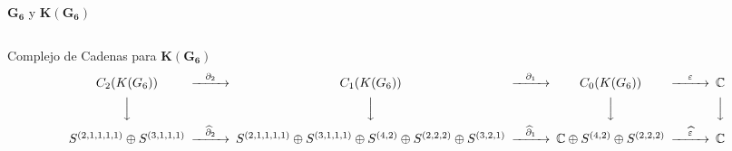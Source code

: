 \documentclass[final,xcolor=svgnames]{beamer}
\begin{document}
\begin{frame}{}
\begin{columns}
\begin{column}{0.5\textwidth}
\begin{block}{$\boldsymbol{G_6}$ y $\boldsymbol{K(G_6)}$}
      \begin{minipage}{0.15\linewidth}    
        \begin{center}
        \end{center}
      \end{minipage}
      \begin{minipage}{0.15\linewidth}    
        \begin{center}
        \end{center}
      \end{minipage}
  \end{block}

    \end{column}
  \end{columns}

  \vfill

  \begin{block}{Complejo de Cadenas para $\boldsymbol{K(G_{6})}$}
    \[
    \begin{CD}
      C_{2}(K(G_{6})) @>{\partial_{2}}>> C_{1}(K(G_{6})) @>{\partial_{1}}>> C_{0}(K(G_{6})) @>{\varepsilon}>> \mathbb{C}\\
      @VVV   @VVV   @VVV   @VVV    \\
      S^{(2,1,1,1,1)}\oplus S^{(3,1,1,1)} @>{\widehat\partial_{2}}>>
      S^{(2,1,1,1,1)}\oplus S^{(3,1,1,1)}\oplus S^{(4,2)}\oplus S^{(2,2,2)}\oplus S^{(3,2,1)} @>{\widehat\partial_{1}}>> 
      \mathbb{C} \oplus S^{(4,2)}\oplus S^{(2,2,2)} @>{\widehat \varepsilon}>>  \mathbb{C}
    \end{CD}
    \]
  \end{block}
\end{frame}
\end{document}
